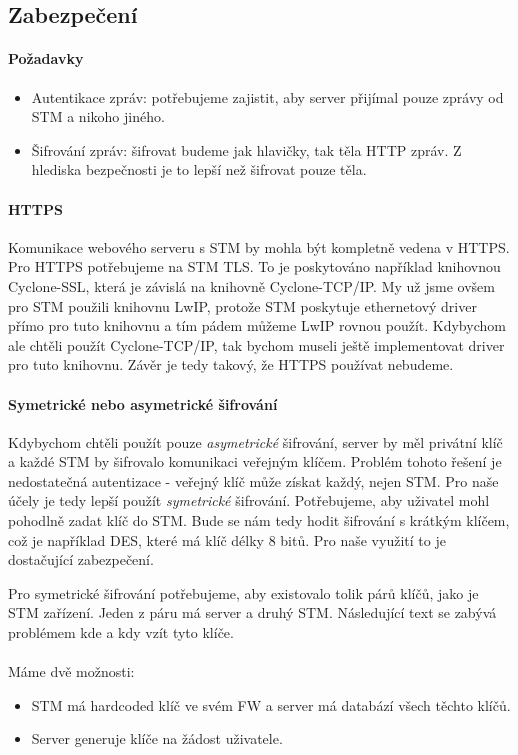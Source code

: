 
\subsection{Zabezpečení}

\paragraph{Požadavky}
\begin{itemize}
    \item Autentikace zpráv: potřebujeme zajistit, aby server přijímal pouze zprávy od STM a nikoho jiného.
    \item Šifrování zpráv: šifrovat budeme jak hlavičky, tak těla HTTP zpráv. Z hlediska bezpečnosti
        je to lepší než šifrovat pouze těla.
\end{itemize}


\paragraph{HTTPS}
Komunikace webového serveru s STM by mohla být kompletně vedena v HTTPS.
Pro HTTPS potřebujeme na STM TLS.
To je poskytováno například knihovnou Cyclone-SSL, která je závislá na knihovně Cyclone-TCP/IP.
My už jsme ovšem pro STM použili knihovnu LwIP, protože STM poskytuje ethernetový driver přímo
pro tuto knihovnu a tím pádem můžeme LwIP rovnou použít.
Kdybychom ale chtěli použít Cyclone-TCP/IP, tak bychom museli ještě implementovat driver pro
tuto knihovnu.
Závěr je tedy takový, že HTTPS používat nebudeme.

\paragraph{Symetrické nebo asymetrické šifrování}
Kdybychom chtěli použít pouze \emph{asymetrické} šifrování, server by měl privátní klíč a každé STM
by šifrovalo komunikaci veřejným klíčem.
Problém tohoto řešení je nedostatečná autentizace - veřejný klíč může získat každý, nejen STM.
Pro naše účely je tedy lepší použít \emph{symetrické} šifrování.
Potřebujeme, aby uživatel mohl pohodlně zadat klíč do STM.
Bude se nám tedy hodit šifrování s krátkým klíčem, což je například DES, které má
klíč délky 8 bitů.
Pro naše využití to je dostačující zabezpečení.


Pro symetrické šifrování potřebujeme, aby existovalo tolik párů klíčů, jako je STM zařízení.
Jeden z páru má server a druhý STM.
Následující text se zabývá problémem kde a kdy vzít tyto klíče.
\\ \\ 
Máme dvě možnosti:
\begin{itemize}
    \item STM má hardcoded klíč ve svém FW a server má databází všech těchto klíčů.
    \item Server generuje klíče na žádost uživatele.
\end{itemize}

